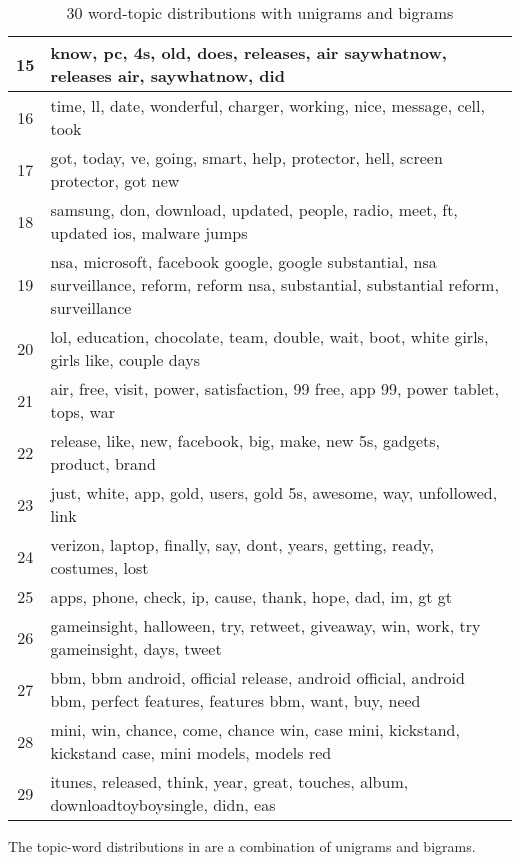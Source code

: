 \begin{table}
\begin{tabular}{c p{16cm}}
    15    & know, pc, 4s, old, does, releases, air saywhatnow, releases air, saywhatnow, did \\ \midrule
    16    & time, ll, date, wonderful, charger, working, nice, message, cell, took \\ \midrule
    17    & got, today, ve, going, smart, help, protector, hell, screen protector, got new \\ \midrule
    18    & samsung, don, download, updated, people, radio, meet, ft, updated ios, malware jumps \\ \midrule
    19    & nsa, microsoft, facebook google, google substantial, nsa surveillance, reform, reform nsa, substantial, substantial reform, surveillance \\ \midrule
    20    & lol, education, chocolate, team, double, wait, boot, white girls, girls like, couple days \\ \midrule
    21    & air, free, visit, power, satisfaction, 99 free, app 99, power tablet, tops, war \\ \midrule
    22    & release, like, new, facebook, big, make, new 5s, gadgets, product, brand \\ \midrule
    23    & just, white, app, gold, users, gold 5s, awesome, way, unfollowed, link \\ \midrule
    24    & verizon, laptop, finally, say, dont, years, getting, ready, costumes, lost \\ \midrule
    25    & apps, phone, check, ip, cause, thank, hope, dad, im, gt gt \\ \midrule
    26    & gameinsight, halloween, try, retweet, giveaway, win, work, try gameinsight, days, tweet \\ \midrule
    27    & bbm, bbm android, official release, android official, android bbm, perfect features, features bbm, want, buy, need \\ \midrule
    28    & mini, win, chance, come, chance win, case mini, kickstand, kickstand case, mini models, models red \\ \midrule
    29    & itunes, released, think, year, great, touches, album, downloadtoyboysingle, didn, eas \\ \bottomrule
  \end{tabular}
  \caption{30 word-topic distributions with unigrams and bigrams}
  \label{tab:unigrams_bigrams_lda}
\end{table}

The topic-word distributions in  are a combination of unigrams
and bigrams.


